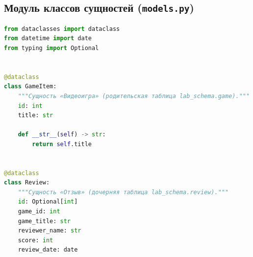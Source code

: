 \documentclass[oneside,a4paper,14pt]{extarticle}
\begin{document}
	\subsection*{Модуль классов сущностей (\texttt{models.py})}
	\begin{lstlisting}[language=Python]
from dataclasses import dataclass
from datetime import date
from typing import Optional


@dataclass
class GameItem:
    """Сущность «Видеоигра» (родительская таблица lab_schema.game)."""
    id: int
    title: str

    def __str__(self) -> str:
        return self.title


@dataclass
class Review:
    """Сущность «Отзыв» (дочерняя таблица lab_schema.review)."""
    id: Optional[int]
    game_id: int
    game_title: str
    reviewer_name: str
    score: int
    review_date: date
	\end{lstlisting}
	
\end{document}

